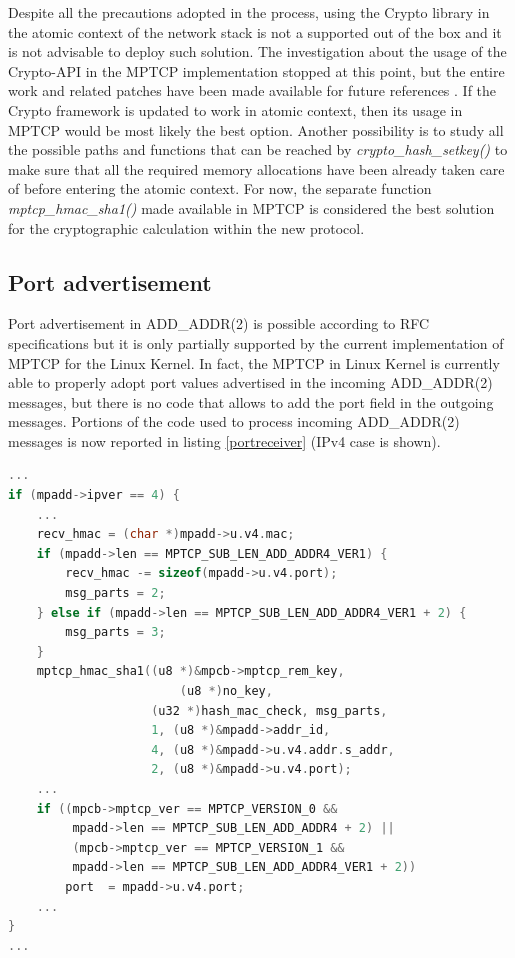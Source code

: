 Despite all the precautions adopted in the process, using the Crypto library in the atomic context of the network stack is not a supported out of the box and it is not advisable to deploy such solution. The investigation about the usage of the Crypto-API in the MPTCP implementation stopped at this point, but the entire work and related patches have been made available for future references \cite{cryptopatch1} \cite{cryptopatch2}. If the Crypto framework is updated to work in atomic context, then its usage in MPTCP would be most likely the best option. Another possibility is to study all the possible paths and functions that can be reached by \textit{crypto\_hash\_setkey()} to make sure that all the required memory allocations have been already taken care of before entering the atomic context. For now, the separate function \textit{mptcp\_hmac\_sha1()} made available in MPTCP is considered the best solution for the cryptographic calculation within the new protocol.

\subsection{Port advertisement}
\label{portad}
Port advertisement in ADD\_ADDR(2) is possible according to RFC specifications but it is only partially supported by the current implementation of MPTCP for the Linux Kernel. In fact, the MPTCP in Linux Kernel is currently able to properly adopt port values advertised in the incoming ADD\_ADDR(2) messages, but there is no code that allows to add the port field in the outgoing messages.
Portions of the code used to process incoming ADD\_ADDR(2) messages is now reported in listing \ref{portreceiver} (IPv4 case is shown).

\begin{lstlisting}[language=c, caption=Handling port field in ADD\_ADDR2 at the receiver, label=portreceiver]
...
if (mpadd->ipver == 4) {
    ...
	recv_hmac = (char *)mpadd->u.v4.mac;
	if (mpadd->len == MPTCP_SUB_LEN_ADD_ADDR4_VER1) {
		recv_hmac -= sizeof(mpadd->u.v4.port);
		msg_parts = 2;
	} else if (mpadd->len == MPTCP_SUB_LEN_ADD_ADDR4_VER1 + 2) {
		msg_parts = 3;
	}
	mptcp_hmac_sha1((u8 *)&mpcb->mptcp_rem_key,
	        			(u8 *)no_key,
			      	(u32 *)hash_mac_check, msg_parts,
				    1, (u8 *)&mpadd->addr_id,
				    4, (u8 *)&mpadd->u.v4.addr.s_addr,
				    2, (u8 *)&mpadd->u.v4.port);
	...
	if ((mpcb->mptcp_ver == MPTCP_VERSION_0 &&
	     mpadd->len == MPTCP_SUB_LEN_ADD_ADDR4 + 2) ||
	     (mpcb->mptcp_ver == MPTCP_VERSION_1 &&
	     mpadd->len == MPTCP_SUB_LEN_ADD_ADDR4_VER1 + 2))
		port  = mpadd->u.v4.port;
	...
}
...
\end{lstlisting}


